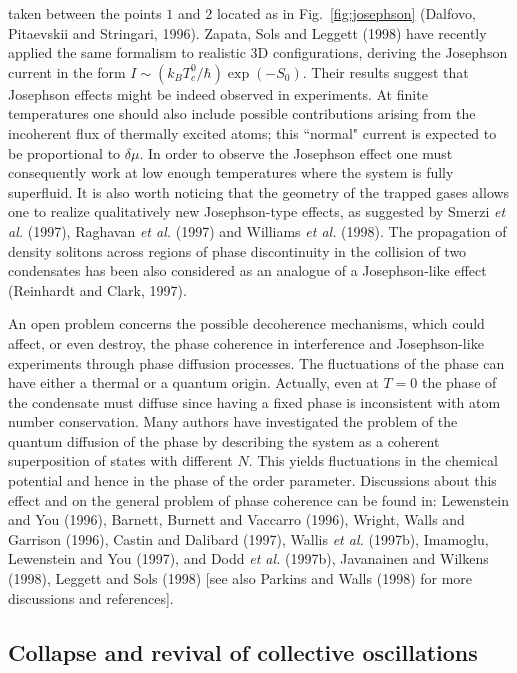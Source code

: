 taken between the points $1$ and $2$ located as in Fig.~\ref{fig:josephson} 
(Dalfovo, Pitaevskii and Stringari, 1996). Zapata,  Sols and Leggett (1998) 
have recently applied the same formalism to realistic 3D configurations,
deriving the Josephson current in the form $I \sim (k_B T_c^0 / \hbar )
\exp(- S_0)$.  Their results suggest that Josephson
effects might be indeed observed in experiments. At finite temperatures
one should also  include possible contributions arising from the incoherent
flux of thermally excited atoms; this ``normal" current is expected to be
proportional to $\delta\mu$. In order to observe the Josephson effect
one must consequently work at low enough temperatures where the system is
fully superfluid. It is also worth noticing that the geometry of the 
trapped gases allows one to realize qualitatively new Josephson-type 
effects, as suggested by Smerzi {\it et al.} (1997), Raghavan {\it et al.}
(1997) and Williams {\it et al.} (1998). The propagation of density
solitons across regions of phase discontinuity in the collision of 
two condensates has been also considered as an analogue of a 
Josephson-like effect (Reinhardt and Clark, 1997). 

An open problem concerns the possible decoherence mechanisms, which 
could affect, or even destroy, the phase coherence in interference and
Josephson-like experiments through phase diffusion processes. The 
fluctuations of the phase can have either a thermal or a 
quantum origin. Actually, even at $T=0$ the phase of the condensate 
must diffuse since having a fixed phase is inconsistent with atom 
number conservation. Many authors have investigated the problem 
of the quantum diffusion of the phase by 
describing the system as a coherent superposition of states with 
different $N$. This yields fluctuations in the chemical potential and 
hence in the phase of the order parameter.  Discussions about this 
effect and on the general problem of phase coherence can be found 
in: Lewenstein and You (1996),  Barnett, Burnett and Vaccarro (1996),  
Wright, Walls and  Garrison (1996), Castin and Dalibard (1997), 
Wallis {\it et al.} (1997b), Imamoglu, Lewenstein and You (1997),
and Dodd {\it et al.} (1997b), Javanainen and Wilkens (1998), 
Leggett and Sols (1998) [see also Parkins and Walls (1998) for 
more discussions and references]. 


\subsection{Collapse and revival of collective oscillations}
\label{sec:collapse}

